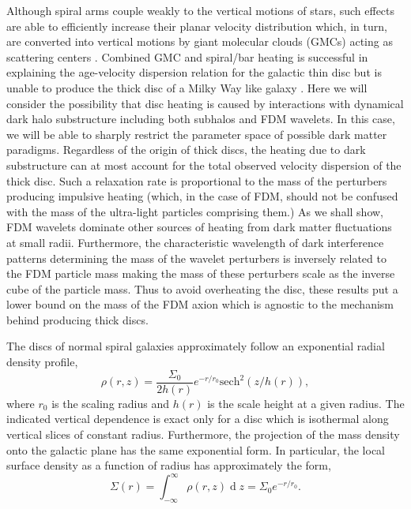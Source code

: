 \documentclass[usenatbib]{mnras}
\renewcommand{\d}[1]{\! \mathrm{d}#1 \:}
\renewcommand{\d}[1]{\ensuremath{\operatorname{d}\!{#1}}}
\begin{document}
Although spiral arms couple weakly to the vertical motions of stars, such effects are able to efficiently increase their planar velocity distribution which, in turn, are converted into vertical motions by giant molecular clouds (GMCs) acting as scattering centers \citep{vertical_structure_and_GMC}. Combined GMC and spiral/bar heating is successful in explaining the age-velocity dispersion relation for the galactic thin disc but is unable to produce the thick disc of a Milky Way like galaxy \citep{heating_history}.
Here we will consider the possibility that disc heating is caused by interactions with dynamical dark halo substructure including both subhalos and FDM wavelets. In this case, we will be able to sharply restrict the parameter space of possible dark matter paradigms. Regardless of the origin of thick discs, the heating due to dark substructure can at most account for the total observed velocity dispersion of the thick disc. {\color{red} Such a relaxation rate is proportional to the mass of the perturbers producing impulsive heating (which, in the case of FDM, should not be confused with the mass of the ultra-light particles comprising them.) As we shall show, FDM wavelets dominate other sources of heating from dark matter fluctuations at small radii. {\color{magenta} Furthermore, the characteristic wavelength of dark interference patterns determining the mass of the wavelet perturbers is inversely related to the FDM particle mass making the mass of these perturbers scale as the inverse cube of the particle mass.} Thus to avoid overheating the disc, these results put a lower bound on the mass of the FDM axion which is agnostic to the mechanism behind producing thick discs. }
\par
The discs of normal spiral galaxies approximately follow an exponential radial density profile,
\begin{equation}
\rho(r, z) = \frac{\Sigma_0}{2 h(r)} e^{-r/r_0} \mathrm{sech}^2{(z/h(r))}, 
\end{equation}
where $r_0$ is the scaling radius and $h(r)$ is the scale height at a given radius. The indicated vertical dependence is exact only for a disc which is isothermal along vertical slices of constant radius. Furthermore, the projection of the mass density onto the galactic plane has the same exponential form. In particular, the local surface density as a function of radius has approximately the form,
\begin{equation}
\Sigma(r) = \int_{-\infty}^{\infty} \rho(r, z) \d{z} = \Sigma_0 e^{-r / r_0}.
\end{equation}
\end{document}
